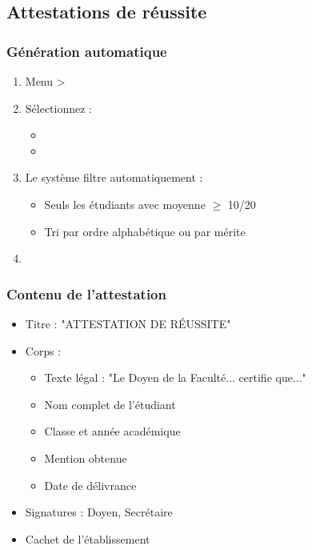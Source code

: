 \subsection{Attestations de réussite}

\subsubsection{Génération automatique}

\begin{enumerate}[leftmargin=*]
    \item Menu  > 
    \item Sélectionnez :
    \begin{itemize}
        \item {}
        \item {}
    \end{itemize}
    \item Le système filtre automatiquement :
    \begin{itemize}
        \item Seuls les étudiants avec moyenne $\geq$ 10/20
        \item Tri par ordre alphabétique ou par mérite
    \end{itemize}
    \item {}
\end{enumerate}

\subsubsection{Contenu de l'attestation}

\begin{itemize}[leftmargin=*]
    \item Titre : "ATTESTATION DE RÉUSSITE"
    \item Corps :
    \begin{itemize}
        \item Texte légal : "Le Doyen de la Faculté... certifie que..."
        \item Nom complet de l'étudiant
        \item Classe et année académique
        \item Mention obtenue
        \item Date de délivrance
    \end{itemize}
    \item Signatures : Doyen, Secrétaire
    \item Cachet de l'établissement
\end{itemize}

